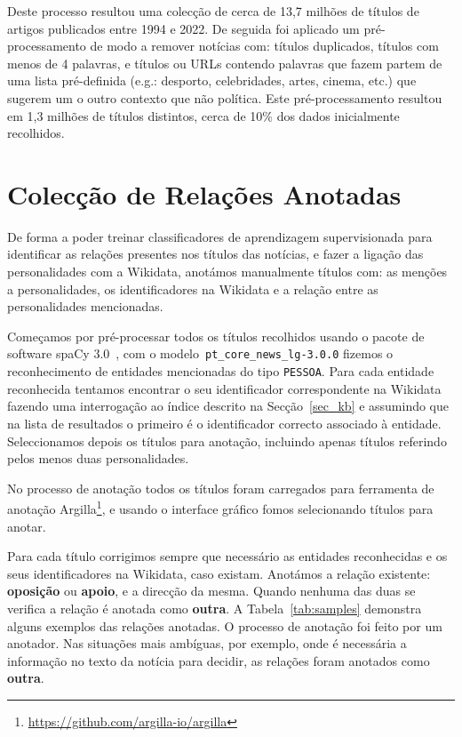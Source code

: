 \documentclass[a4paper, twocolumn, 11pt, twoside]{article}
\begin{document}
Deste processo resultou uma colecção de cerca de 13,7 milhões de títulos de artigos publicados entre 1994 e 2022. De seguida foi aplicado um pré-processamento de modo a remover notícias com: títulos duplicados, títulos com menos de 4 palavras, e títulos ou URLs contendo palavras que fazem partem de uma lista pré-definida (e.g.: desporto, celebridades, artes, cinema, etc.) que sugerem um o outro contexto que não política. Este pré-processamento resultou em 1,3 milhões de títulos distintos, cerca de 10\% dos dados inicialmente recolhidos.

\section{Colecção de Relações Anotadas}
\label{sec:rel_data_annot}

De forma a poder treinar classificadores de aprendizagem supervisionada para identificar as relações presentes nos títulos das notícias, e fazer a ligação das personalidades com a Wikidata, anotámos manualmente títulos com: as menções a personalidades, os identificadores na Wikidata e a relação entre as personalidades mencionadas.

Começamos por pré-processar todos os títulos recolhidos usando o pacote de software spaCy 3.0~\citep{spacy}, com o modelo~\texttt{pt\_core\_news\_lg-3.0.0} fizemos o reconhecimento de entidades mencionadas do tipo \texttt{PESSOA}. Para cada entidade reconhecida tentamos encontrar o seu identificador correspondente na Wikidata fazendo uma interrogação ao índice descrito na Secção~\ref{sec_kb} e assumindo que na lista de resultados o primeiro é o identificador correcto associado à entidade. Seleccionamos depois os títulos para anotação, incluindo apenas títulos referindo pelos menos duas personalidades.

No processo de anotação todos os títulos foram carregados para ferramenta de anotação Argilla\footnote{\url{https://github.com/argilla-io/argilla}}, e usando o interface gráfico fomos selecionando títulos para anotar. 

Para cada título corrigimos sempre que necessário as entidades reconhecidas e os seus identificadores na Wikidata, caso existam. Anotámos a relação existente: \textbf{oposição} ou \textbf{apoio}, e a direcção da mesma. Quando nenhuma das duas se verifica a relação é anotada como \textbf{outra}. A Tabela~\ref{tab:samples} demonstra alguns exemplos das relações anotadas. O processo de anotação foi feito por um anotador. Nas situações mais ambíguas, por exemplo, onde é necessária a informação no texto da notícia para decidir, as relações foram anotados como \textbf{outra}.
\end{document}
